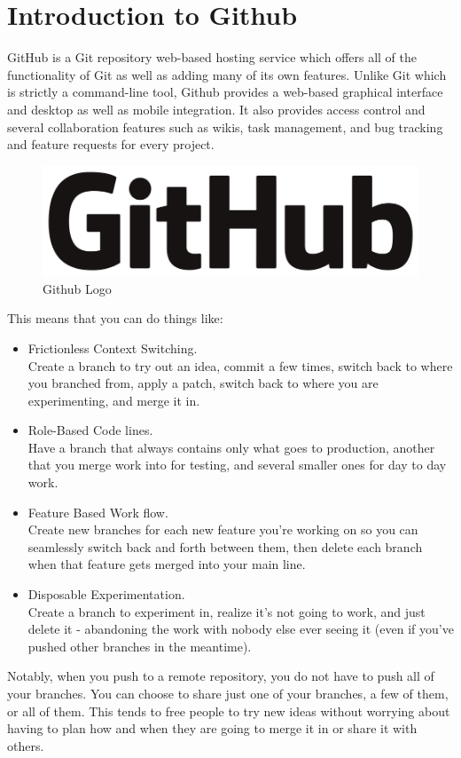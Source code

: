 
\section{Introduction to Github}

GitHub is a Git repository web-based hosting service which offers all of the functionality of Git as well as adding many of its own features. Unlike Git which is strictly a command-line tool, Github provides a web-based graphical interface and desktop as well as mobile integration. It also provides access control and several collaboration features such as wikis, task management, and bug tracking and feature requests for every project.\\

\begin{figure}[H]
	\centering
	\includegraphics[width=0.7\linewidth]{images/Github}
	\caption{Github Logo}
	\label{fig:930px-githublogo2013padded}
\end{figure}


This means that you can do things like:
\begin{itemize}
\item Frictionless Context Switching.\\ Create a branch to try out an
idea, commit a few times, switch back to where you branched from,
apply a patch, switch back to where you are experimenting, and merge
it in.
\item Role-Based Code lines. \\ Have a branch that always contains only
what goes to production, another that you merge work into for testing,
and several smaller ones for day to day work.
\item Feature Based Work flow. \\ Create new branches for each new
feature you're working on so you can seamlessly switch back and forth
between them, then delete each branch when that feature gets merged
into your main line.
\item Disposable Experimentation.\\  Create a branch to experiment in,
realize it's not going to work, and just delete it - abandoning the
work with nobody else ever seeing it (even if you've pushed other
branches in the meantime).
\end{itemize}
Notably, when you push to a remote repository, you do not have to push
all of your branches. You can choose to share just one of your
branches, a few of them, or all of them. This tends to free people to
try new ideas without worrying about having to plan how and when they
are going to merge it in or share it with others.\\ \\

